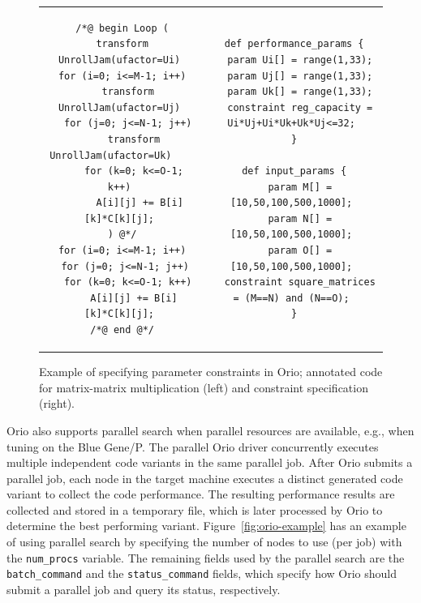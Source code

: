 \begin{figure}%
\centering 
\begin{tabular}{cc} 
\begin{minipage}{.5\textwidth}  
\scriptsize
\begin{verbatim}  
 /*@ begin Loop (
 transform UnrollJam(ufactor=Ui)
 for (i=0; i<=M-1; i++)
   transform UnrollJam(ufactor=Uj)
   for (j=0; j<=N-1; j++)
     transform UnrollJam(ufactor=Uk)   
     for (k=0; k<=O-1; k++)
       A[i][j] += B[i][k]*C[k][j];
 ) @*/
 for (i=0; i<=M-1; i++)
  for (j=0; j<=N-1; j++)
   for (k=0; k<=O-1; k++)
     A[i][j] += B[i][k]*C[k][j];
 /*@ end @*/
\end{verbatim}  
\end{minipage}
&
\begin{minipage}{.5\textwidth}  
\scriptsize
\begin{verbatim}  
 def performance_params {
   param Ui[] = range(1,33);
   param Uj[] = range(1,33);
   param Uk[] = range(1,33);
   constraint reg_capacity = Ui*Uj+Ui*Uk+Uk*Uj<=32;
 }

 def input_params {
   param M[] = [10,50,100,500,1000];
   param N[] = [10,50,100,500,1000];
   param O[] = [10,50,100,500,1000];
   constraint square_matrices = (M==N) and (N==O);
 }

\end{verbatim}  
\end{minipage}
\\
\end{tabular}
\caption{Example of specifying parameter constraints in Orio; annotated code for matrix-matrix multiplication (left) and constraint specification (right).}
\label{fig:par-constraint}  
\end{figure} 

Orio also supports parallel search when parallel resources are available,
e.g., when tuning on the Blue Gene/P. The parallel Orio driver concurrently
executes multiple independent code variants in the same parallel job. After
Orio submits a parallel job, each node in the target machine executes a
distinct generated code variant to collect the code performance. The
resulting performance results are collected and stored in a temporary file,
which is later processed by Orio to determine the best performing variant.
Figure~\ref{fig:orio-example} has an example of using parallel search by
specifying the number of nodes to use (per job) with the \texttt{num\_procs}
variable. The remaining fields used by the parallel search are the
\texttt{batch\_command} and the \texttt{status\_command} fields, which specify how Orio
should submit a parallel job and query its status, respectively.

